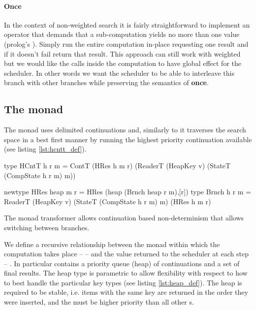 \paragraph{Once}
In the context of non-weighted search it is fairly
straightforward to implement an operator that demands that a sub-computation yields no more than
one value (prolog's ). Simply run the entire computation
in-place requesting one result and if it doesn't fail return that
result. This approach can still work with weighted but we would like
the  calls inside the computation to have global effect for the
scheduler. In other words we want the scheduler to be able to
interleave this branch with other branches while preserving the
semantics of \textbf{once}.


\subsection{The  monad}

The  monad uses delimited continuations and, similarly to \cite{kidneyAlgebrasWeightedSearch2021}
it traverses the search space in a best first manner by running the
highest priority continuation available (see listing \ref{lst:hcntt_def}).

\begin{code}
\begin{haskellcode}
type HCntT h r m = ContT (HRes h m r)
  (ReaderT (HeapKey v)
   (StateT (CompState h r m) m))

newtype HRes heap m r = HRes (heap (Brnch heap r m),[r])
type Brnch h r m = ReaderT (HeapKey v)
  (StateT (CompState h r m) m) (HRes h m r)
\end{haskellcode}

  \caption{\label{lst:hcntt_def} The  monad transformer
    allows continuation based non-determinism that allows switching
    between branches.}
\end{code}

We define a recursive relationship between the monad within which the computation
takes place -- -- and the value returned to the scheduler at
each step -- . In particular  contains a priority queue
(heap) of continuations and a set of final results. The heap type is parametric to allow
flexibility with respect to how to best handle the particular key
types (see listing \ref{lst:heap_def}). The heap is required to be stable,
i.e. items with the same key are returned in the order they were
inserted, and the   must be higher priority than all
other s.

